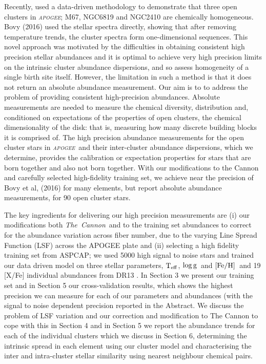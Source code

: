 \documentclass[14pt, preprint2]{aastex6}
\newcommand{\project}[1]{\textsl{#1}}
\newcommand{\tc}{\project{The~Cannon}}
\newcommand{\apogee}{\project{\textsc{apogee}}}
\newcommand{\teff}{\mbox{$\rm T_{eff}$}}
\newcommand{\feh}{\mbox{$\rm [Fe/H]$}}
\newcommand{\logg}{\mbox{$\rm \log g$}}
\begin{document}
Recently, \citet{Bovy2016} used a data-driven methodology to demonstrate that three open clusters in \apogee; M67, NGC6819 and NGC2410 are chemically homogeneous. Bovy (2016) used the stellar spectra directly, showing that after removing temperature trends, the cluster spectra form one-dimensional sequences. This novel approach was motivated by the difficulties in obtaining consistent high precision stellar abundances and it is optimal to achieve very high precision limits on the intrinsic cluster abundance dispersions, and so assess homogeneity of a single birth site itself. However, the limitation in such a method is that it does not return an absolute abundance measurement. Our aim is to to address the problem of providing consistent high-precision abundances.  Absolute measurements are needed to measure the chemical diversity, distribution and, conditioned on expectations of the properties of open clusters, the chemical dimensionality of the disk: that is, measuring how many discrete building blocks it is comprised of.  The high precision abundance measurements for the open cluster stars in \apogee\ and their inter-cluster abundance dispersions, which we determine, provides the calibration or expectation properties for stars that are born together and also not born together. With our modifications to the Cannon and carefully selected high-fidelity training set, we achieve near the precision of Bovy et al, (2016) for many elements, but report absolute abundance measurements, for 90 open cluster stars. 

The key ingredients for delivering our high precision measurements are (i) our modifications both \tc\ and to the training set abundances to correct for the abundance variation across fiber number, due to the varying Line Spread Function (LSF) across the APOGEE plate and (ii) selecting a high fidelity training set from ASPCAP; we used 5000 high signal to noise stars and trained our data driven model on three stellar parameters, \teff, \logg\ and \feh\ and 19 [X/Fe] individual abundances from DR13 \citep{Holtzman2015}.   In Section 3 we present our training set and in Section 5 our cross-validation results, which shows the highest precision we can measure for each of our parameters and abundances (with the signal to noise dependent precision reported in the Abstract. We discuss the problem of LSF variation and our correction and modification to The Cannon to cope with this in Section 4 and in Section 5
we report the abundance trends for each of the individual clusters which we discuss in Section 6, determining the intrinsic spread in each element using our cluster model and characterising the inter and intra-cluster stellar similarity using nearest neighbour chemical pairs.  
\end{document}
